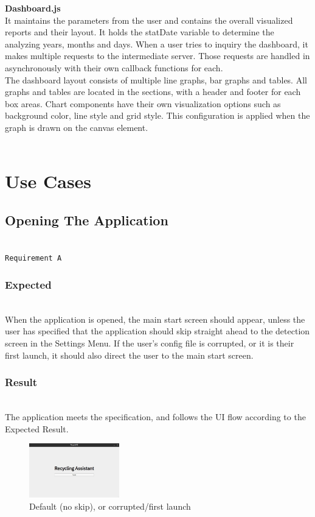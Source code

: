 \documentclass[conference]{IEEEtran}
\begin{document}
\textbf{Dashboard.js}~\\

It maintains the parameters from the user and contains the overall visualized reports and their layout. It holds the statDate variable to determine the analyzing years, months and days. When a user tries to inquiry the dashboard, it makes multiple requests to the intermediate server. Those requests are handled in asynchronously with their own callback functions for each.\\

The dashboard layout consists of multiple line graphs, bar graphs and tables. All graphs and tables are located in the sections, with a header and footer for each box areas. Chart components have their own visualization options such as background color, line style and grid style. This configuration is applied when the graph is drawn on the canvas element.~\\~\\

\section{Use Cases}

\subsection{Opening The Application}~\\
\texttt{Requirement A}~\\
\subsubsection{Expected}~\\
When the application is opened, the main start screen should appear, unless the user has specified that the application should skip straight ahead to the detection screen in the Settings Menu. If the user's config file is corrupted, or it is their first launch, it should also direct the user to the main start screen.~\\

\subsubsection{Result}~\\
The application meets the specification, and follows the UI flow according to the Expected Result.

\begin{figure}[!h]
    \centering
    \includegraphics[width=0.35\textwidth]{images/start.eps}
    \caption{Default (no skip), or corrupted/first launch}
\end{figure}
\end{document}
